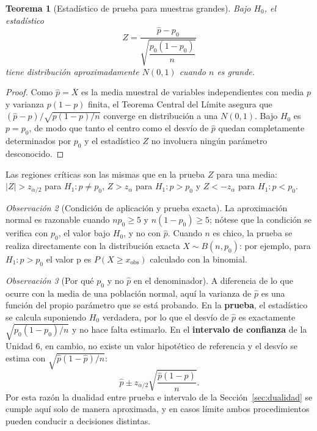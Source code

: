 \documentclass[11pt,a4paper]{article}
\theoremstyle{plain}
\newtheorem{teorema}{Teorema}[section]
\theoremstyle{definition}
\theoremstyle{remark}
\newtheorem{observacion}[teorema]{Observación}
\begin{document}
\begin{teorema}[Estadístico de prueba para muestras grandes]
Bajo $H_0$, el estadístico
\[
Z=\frac{\hat p-p_0}{\sqrt{\dfrac{p_0(1-p_0)}{n}}}
\]
tiene distribución aproximadamente $N(0,1)$ cuando $n$ es grande.
\end{teorema}

\begin{proof}
Como $\hat p=\overline X$ es la media muestral de variables independientes con media $p$ y varianza $p(1-p)$ finita, el Teorema Central del Límite asegura que $(\hat p-p)/\sqrt{p(1-p)/n}$ converge en distribución a una $N(0,1)$. Bajo $H_0$ es $p=p_0$, de modo que tanto el centro como el desvío de $\hat p$ quedan completamente determinados por $p_0$ y el estadístico $Z$ no involucra ningún parámetro desconocido.
\end{proof}

Las regiones críticas son las mismas que en la prueba $Z$ para una media: $|Z|>z_{\alpha/2}$ para $H_1:p\neq p_0$, $Z>z_\alpha$ para $H_1:p>p_0$ y $Z<-z_\alpha$ para $H_1:p<p_0$.

\begin{observacion}[Condición de aplicación y prueba exacta]
La aproximación normal es razonable cuando $np_0\ge5$ y $n(1-p_0)\ge5$; nótese que la condición se verifica con $p_0$, el valor bajo $H_0$, y no con $\hat p$. Cuando $n$ es chico, la prueba se realiza directamente con la distribución exacta $X\sim B(n,p_0)$: por ejemplo, para $H_1:p>p_0$ el valor p es $P(X\ge x_{\text{obs}})$ calculado con la binomial.
\end{observacion}

\begin{observacion}[Por qué $p_0$ y no $\hat p$ en el denominador]
A diferencia de lo que ocurre con la media de una población normal, aquí la varianza de $\hat p$ es una función del propio parámetro que se está probando. En la \textbf{prueba}, el estadístico se calcula suponiendo $H_0$ verdadera, por lo que el desvío de $\hat p$ es exactamente $\sqrt{p_0(1-p_0)/n}$ y no hace falta estimarlo. En el \textbf{intervalo de confianza} de la Unidad 6, en cambio, no existe un valor hipotético de referencia y el desvío se estima con $\sqrt{\hat p(1-\hat p)/n}$:
\[
\hat p\pm z_{\alpha/2}\sqrt{\frac{\hat p(1-\hat p)}{n}}.
\]
Por esta razón la dualidad entre prueba e intervalo de la Sección~\ref{sec:dualidad} se cumple aquí solo de manera aproximada, y en casos límite ambos procedimientos pueden conducir a decisiones distintas.
\end{observacion}
\end{document}
